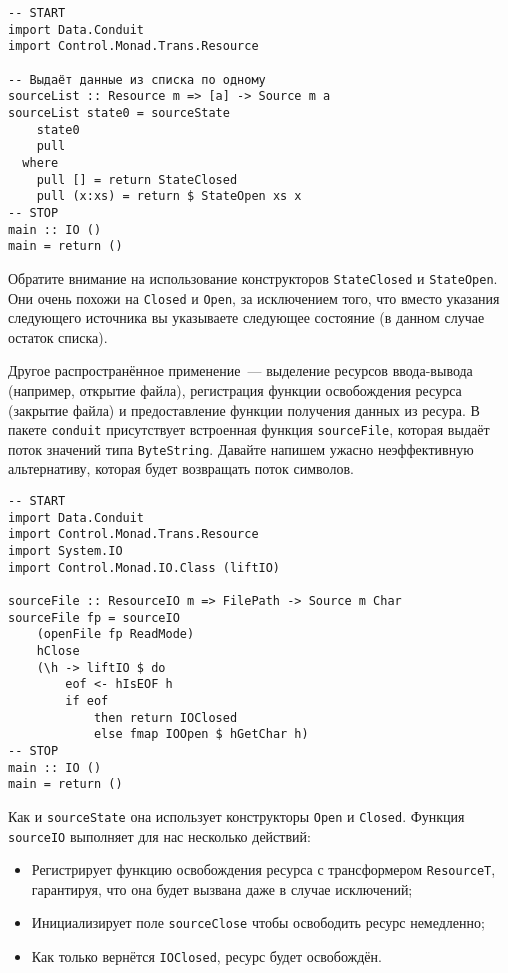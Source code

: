 \begin{lstlisting}
-- START
import Data.Conduit
import Control.Monad.Trans.Resource

-- Выдаёт данные из списка по одному
sourceList :: Resource m => [a] -> Source m a
sourceList state0 = sourceState
    state0
    pull
  where
    pull [] = return StateClosed
    pull (x:xs) = return $ StateOpen xs x
-- STOP
main :: IO ()
main = return ()
\end{lstlisting}

Обратите внимание на использование конструкторов \lstinline=StateClosed= и \lstinline=StateOpen=.
Они очень похожи на
\lstinline=Closed= и \lstinline=Open=, за исключением того, что вместо указания следующего
источника вы указываете следующее состояние (в данном случае остаток списка).

Другое распространённое применение~--- выделение ресурсов ввода-вывода (например,
открытие файла), регистрация функции освобождения ресурса (закрытие файла) и
предоставление функции получения данных из ресура.
В пакете \texttt{conduit} присутствует встроенная функция \lstinline!sourceFile!, которая выдаёт поток
значений типа \lstinline=ByteString=. Давайте напишем ужасно неэффективную
альтернативу, которая будет возвращать поток символов.

\begin{lstlisting}
-- START
import Data.Conduit
import Control.Monad.Trans.Resource
import System.IO
import Control.Monad.IO.Class (liftIO)

sourceFile :: ResourceIO m => FilePath -> Source m Char
sourceFile fp = sourceIO
    (openFile fp ReadMode)
    hClose
    (\h -> liftIO $ do
        eof <- hIsEOF h
        if eof
            then return IOClosed
            else fmap IOOpen $ hGetChar h)
-- STOP
main :: IO ()
main = return ()
\end{lstlisting}

Как и \verb=sourceState= она использует конструкторы \verb*|Open| и \verb*|Closed|.
Функция \lstinline=sourceIO= выполняет для нас несколько действий:
\begin{itemize}
 \item Регистрирует функцию освобождения ресурса с трансформером \lstinline=ResourceT=,
гарантируя, что она будет вызвана даже в случае исключений;
 \item Инициализирует поле \lstinline=sourceClose= чтобы освободить ресурс немедленно;
 \item Как только вернётся \lstinline=IOClosed=, ресурс будет освобождён.
\end{itemize}
  
